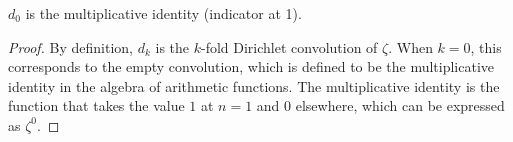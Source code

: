 \begin{theorem}[d zero]
\label{d_zero}
\leanok
$d_0$ is the multiplicative identity (indicator at 1).
\end{theorem}
\begin{proof}
\leanok
By definition, $d_k$ is the $k$-fold Dirichlet convolution of $\zeta$. When $k = 0$, this corresponds to the empty convolution, which is defined to be the multiplicative identity in the algebra of arithmetic functions. The multiplicative identity is the function that takes the value $1$ at $n=1$ and $0$ elsewhere, which can be expressed as $\zeta^0$.
\end{proof}
